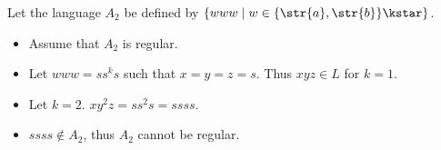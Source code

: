 Let the language $A_2$ be defined by $\{www \mid w \in \{\str{a}, \str{b}\}\kstar \}$.
\begin{itemize}
	\item Assume that $A_2$ is regular.
	\item Let $www = ss^ks$ such that $x = y = z = s$. Thus $xyz \in L$ for $k=1$.
	\item Let $k=2$. $xy^2z = ss^2s = ssss$.
	\item $ssss \notin A_2$, thus $A_2$ cannot be regular.
\end{itemize}